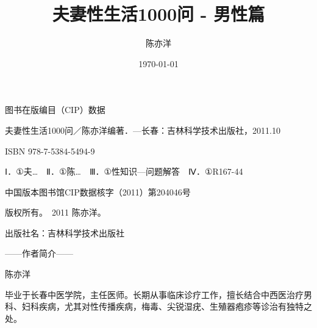 \usepackage{calc}
\usepackage{ifthen}
\usepackage{afterpage}
\usepackage{pdfpages}

\title{\hei{} 夫妻性生活1000问 - 男性篇}
\author{陈亦洋}
\date{\today}



\maketitle

\newpage
\thispagestyle{empty}
\begin{center}
    \vspace*{8cm}
    \song{} 图书在版编目（CIP）数据\par
    \vspace{0.5em}
    \song{} 夫妻性生活1000问／陈亦洋编著．—长春：吉林科学技术出版社，2011.10\par
    \vspace{0.5em}
    \song{} ISBN 978-7-5384-5494-9\par
    \vspace{0.5em}
    \song{} Ⅰ．①夫…　Ⅱ．①陈…　Ⅲ．①性知识—问题解答　Ⅳ．①R167-44\par
    \vspace{0.5em}
    \song{} 中国版本图书馆CIP数据核字（2011）第204046号\par
    \vspace{2em}
    \song{} 版权所有。\textcopyright\ 2011 陈亦洋。\par
    \vspace{0.5em}
    \song{} 出版社名：吉林科学技术出版社\par
\end{center}

\newpage
\thispagestyle{empty}
\begin{center}
    \vspace*{5cm}
    \hei{} ——作者简介——
\end{center}

\begin{center}
    \hei{} 陈亦洋
\end{center}

\vspace{1cm}
\begin{center}
    \song{} 毕业于长春中医学院，主任医师。长期从事临床诊疗工作，擅长结合中西医治疗男科、妇科疾病，尤其对性传播疾病，梅毒、尖锐湿疣、生殖器疱疹等诊治有独特之处。
\end{center}

